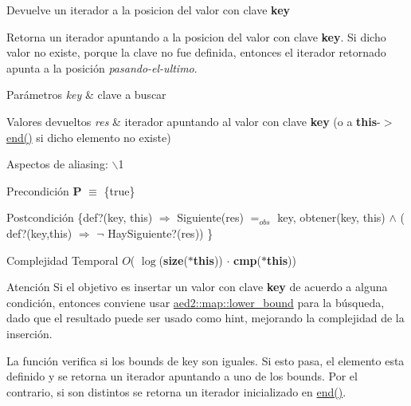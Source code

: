 \-Devuelve un iterador a la posicion del valor con clave {\bfseries key} 

\-Retorna un iterador apuntando a la posicion del valor con clave {\bfseries key}. \-Si dicho valor no existe, porque la clave no fue definida, entonces el iterador retornado apunta a la posición {\itshape pasando-\/el-\/ultimo\/}.


\begin{DoxyParams}{\-Parámetros}
{\em key} & clave a buscar \\
\hline
\end{DoxyParams}

\begin{DoxyRetVals}{\-Valores devueltos}
{\em res} & iterador apuntando al valor con clave {\bfseries key} (o a {\bfseries this}-\/$>$\hyperlink{classaed2_1_1map_a76023e6a56cb625513e1b5ea028bf983_a76023e6a56cb625513e1b5ea028bf983}{end()} si dicho elemento no existe)\\
\hline
\end{DoxyRetVals}
\begin{DoxyParagraph}{\-Aspectos de aliasing\-:}
$\backslash$1
\end{DoxyParagraph}
\begin{DoxyPrecond}{\-Precondición}
{\bfseries \-P} $\equiv$ \{true\} 
\end{DoxyPrecond}
\begin{DoxyPostcond}{\-Postcondición}
\{def?(key, this) $\Rightarrow$ \-Siguiente(res) $=_{obs}$  key, obtener(key, this)  $\land$ ( def?(key,this) $\Rightarrow$ $\lnot$ \-Hay\-Siguiente?(res)) \}
\end{DoxyPostcond}

\begin{DoxyDescription}
\item[\-Complejidad \-Temporal]$O$( $\log$({\bfseries size}({\bfseries $\ast$this})) $\cdot$ {\bfseries cmp}({\bfseries $\ast$this}))
\end{DoxyDescription}

\begin{DoxyAttention}{\-Atención}
\-Si el objetivo es insertar un valor con clave {\bfseries key} de acuerdo a alguna condición, entonces conviene usar \hyperlink{classaed2_1_1map_a3399d36fdd5a880b494f3a5795d3f18f_a3399d36fdd5a880b494f3a5795d3f18f}{aed2\-::map\-::lower\-\_\-bound} para la búsqueda, dado que el resultado puede ser usado como hint, mejorando la complejidad de la inserción.
\end{DoxyAttention}
\-La función verifica si los bounds de key son iguales. \-Si esto pasa, el elemento esta definido y se retorna un iterador apuntando a uno de los bounds. \-Por el contrario, si son distintos se retorna un iterador inicializado en \hyperlink{classaed2_1_1map_a76023e6a56cb625513e1b5ea028bf983_a76023e6a56cb625513e1b5ea028bf983}{end()}. 

